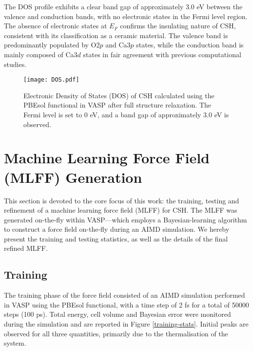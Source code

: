 The DOS profile exhibits a clear band gap of approximately 3.0 eV between the valence and conduction bands, with no electronic states in the Fermi level region. The absence of electronic states at $E_F$ confirms the insulating nature of CSH, consistent with its classification as a ceramic material. The valence band is predominantly populated by O2$p$ and Ca3$p$ states, while the conduction band is mainly composed of Ca3$d$ states in fair agreement with previous computational studies\supercite{Dharmawardhana2018}. 
\begin{figure}[H]
    \centering
    \texttt{[image: DOS.pdf]}
    \caption{
        Electronic Density of States (DOS) of CSH calculated using the PBEsol functional in VASP after full structure relaxation. The Fermi level is set to 0 eV, and a band gap of approximately 3.0 eV is observed. 
    }
    \label{dos}
\end{figure}

\section{Machine Learning Force Field (MLFF) Generation}
\label{sec:mlff-training}

This section is devoted to the core focus of this work: the training, testing and refinement of a machine learning force field (MLFF) for CSH. The MLFF was generated on-the-fly within VASP---which employs a Bayesian-learning algorithm to construct a force field on-the-fly during an AIMD simulation\supercite{zotero-item-773}. We hereby present the training and testing statistics, as well as the details of the final refined MLFF. 
\subsection{Training}
The training phase of the force field consisted of an AIMD simulation performed in VASP using the PBEsol functional, with a time step of 2 fs for a total of 50000 steps (100 ps). Total energy, cell volume and Bayesian error were monitored during the simulation and are reported in Figure \ref{training-stats}. Initial peaks are observed for all three quantities, primarily due to the thermalisation of the system.

